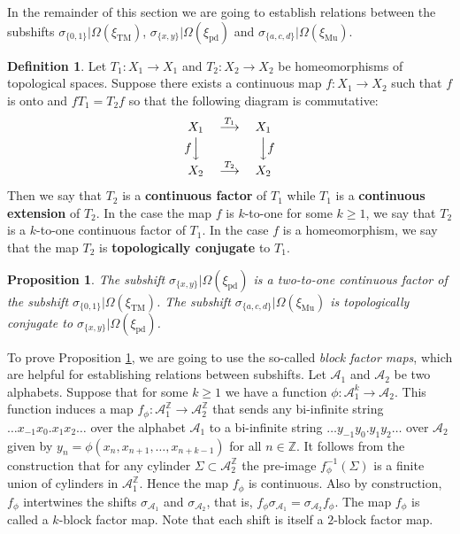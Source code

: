 \documentclass[12pt]{article}
\newtheorem{proposition}[theorem]{Proposition}
\theoremstyle{definition}
\newtheorem{definition}[theorem]{Definition}
\def\bZ{\mathbb{Z}}
\def\cA{\mathcal{A}}
\def\si{\sigma}
\def\Om{\Omega}
\def\xiTM{\xi_{\mathrm{TM}}}
\def\xipd{\xi_{\mathrm{pd}}}
\def\xiGE{\xi_{\mathrm{Mu}}}
\begin{document}
In the remainder of this section we are going to establish relations 
between the subshifts $\si_{\{0,1\}}|\Om(\xiTM)$,
$\si_{\{x,y\}}|\Om(\xipd)$ and $\si_{\{a,c,d\}}|\Om(\xiGE)$.

\begin{definition}\label{def-factor}
Let $T_1:X_1\to X_1$ and $T_2:X_2\to X_2$ be homeomorphisms of topological 
spaces.  Suppose there exists a continuous map $f:X_1\to X_2$ such that $f$ 
is onto and $fT_1=T_2f$ so that the following diagram is commutative:
\[\begin{array}{ccc}
X_1 & \stackrel{T_1}{\longrightarrow} & X_1\\[0.2em]
f\Big\downarrow\phantom{f} && \phantom{f}\Big\downarrow f\\[0.25em]
X_2 & \stackrel{T_2}{\longrightarrow} & X_2
\end{array}
\]
Then we say that $T_2$ is a \textbf{continuous factor} of $T_1$ while $T_1$ 
is a \textbf{continuous extension} of $T_2$.  In the case the map $f$ is 
$k$-to-one for some $k\ge1$, we say that $T_2$ is a $k$-to-one continuous 
factor of $T_1$.  In the case $f$ is a homeomorphism, we say that the map 
$T_2$ is \textbf{topologically conjugate} to $T_1$. 
\end{definition}

\begin{proposition}\label{3-subshifts-factors}
The subshift $\si_{\{x,y\}}|\Om(\xipd)$ is a two-to-one continuous factor 
of the subshift $\si_{\{0,1\}}|\Om(\xiTM)$.  The subshift 
$\si_{\{a,c,d\}}|\Om(\xiGE)$ is topologically conjugate to 
$\si_{\{x,y\}}|\Om(\xipd)$.
\end{proposition}

To prove Proposition \ref{3-subshifts-factors}, we are going to use the 
so-called \emph{block factor maps}, which are helpful for establishing 
relations between subshifts.  Let $\cA_1$ and $\cA_2$ be two alphabets.  
Suppose that for some $k\ge1$ we have a function $\phi:\cA_1^k\to\cA_2$.  
This function induces a map $f_\phi:\cA_1^{\bZ}\to\cA_2^{\bZ}$ that sends 
any bi-infinite string $\ldots x_{-1}x_0.x_1x_2\ldots$ over the alphabet 
$\cA_1$ to a bi-infinite string $\ldots y_{-1}y_0.y_1y_2\ldots$ over 
$\cA_2$ given by $y_n=\phi(x_n,x_{n+1},\dots,x_{n+k-1})$ for all 
$n\in\bZ$.  It follows from the construction that for any cylinder 
$\Sigma\subset\cA_2^{\bZ}$ the pre-image $f_\phi^{-1}(\Sigma)$ is a finite 
union of cylinders in $\cA_1^{\bZ}$.  Hence the map $f_\phi$ is 
continuous.  Also by construction, $f_\phi$ intertwines the shifts 
$\si_{\cA_1}$ and $\si_{\cA_2}$, that is, 
$f_\phi\si_{\cA_1}=\si_{\cA_2}f_\phi$.  The map $f_\phi$ is called a 
$k$-block factor map.  Note that each shift is itself a $2$-block factor 
map.
\end{document}
